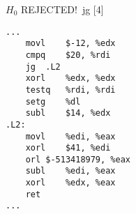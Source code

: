 \begin{figure}[H]
\begin{subfigure}[T]{0.30333333333333334\textwidth}
\begin{lrbox}{\mybox}
%
        \end{lrbox}\resizebox{\textwidth}{!}{\usebox{\mybox}}
\end{subfigure}
\begin{subfigure}[T]{0.30333333333333334\textwidth}
\caption*{}
\end{subfigure}
\begin{subfigure}[T]{0.30333333333333334\textwidth}
\caption*{}
\end{subfigure}
\hspace*{6mm}
\begin{subfigure}[T]{0.2733333333333333\textwidth}
\vspace*{2mm}\tiny {\color{red}$H_0$ REJECTED!}\ \vspace*{2mm}\tiny jg [4]
\begin{lstlisting}[style=defstyle,language={[x86masm]Assembler},basicstyle=\tiny\ttfamily,breaklines=true]
...
	movl	$-12, %edx
	cmpq	$20, %rdi
	jg	.L2
	xorl	%edx, %edx
	testq	%rdi, %rdi
	setg	%dl
	subl	$14, %edx
.L2:
	movl	%edi, %eax
	xorl	$41, %edi
	orl	$-513418979, %eax
	subl	%edi, %eax
	xorl	%edx, %eax
	ret
...\end{lstlisting}
\end{subfigure}
\end{figure}
\newpage\noindent
